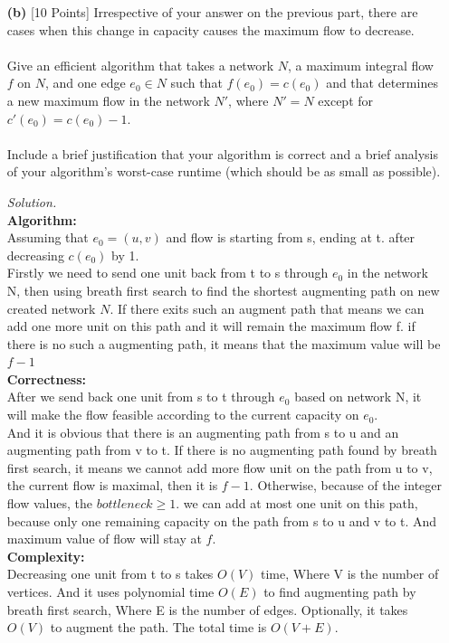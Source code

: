 \documentclass[10pt]{article}
\begin{document}
\begin{enumerate}
\begin{mdframed}
    \end{mdframed}
    \item[\textbf{(b)}] {[10 Points]} Irrespective of your answer on the previous part, there are cases when this change in capacity causes the maximum flow to decrease.\\
    \\
    Give an efficient algorithm that takes a network $N$, a maximum integral flow $f$ on $N$, and one edge $e_0 \in N$ such that $f(e_0) = c(e_0)$ and that determines a new maximum flow in the network $N'$, where $N' = N$ except for $c'(e_0) = c(e_0) - 1$.\\
    \\
    Include a brief justification that your algorithm is correct and a brief analysis of your algorithm’s worst-case runtime (which should be as small as possible).
     \begin{mdframed}
        \textit{Solution.}\\
        \textbf{Algorithm:}\\
        Assuming that $e_0 = (u,v)$ and flow is starting from s, ending at t. after decreasing $c(e_0)$ by 1.\\ Firstly we need to send one unit back from t to s through $e_0$ in the network N, then using breath first search to find the shortest augmenting path on new created network $N$. If there exits such an augment path that means we can add one more unit on this path and it will remain the maximum flow f. if there is no such a augmenting path, it means that the maximum value will be $f-1$\\
        \textbf{Correctness:}\\
        After we send back one unit from s to t through $e_0$ based on network N, it will make the flow feasible according to the current capacity on $e_0$.\\
        And it is obvious that there is an augmenting path from s to u and an augmenting path from v to t. If there is no augmenting path found by breath first search, it means we cannot add more flow unit on the path from u to v, the current flow is maximal, then it is $f-1$. Otherwise, because of the integer flow values, the $bottleneck \geq 1$. we can add at most one unit on this path, because only one remaining capacity on the path from s to u and v to t. And maximum value of flow will stay at $f$.\\
        \textbf{Complexity:}\\
        Decreasing one unit from t to s takes $O(V)$ time, Where V is the number of vertices. And it uses polynomial time $O(E)$ to find augmenting path by breath first search, Where E is the number of edges. Optionally, it takes $O(V)$ to augment the path. The total time is $O(V+E)$.

\end{mdframed}
\end{enumerate}
\end{document}
